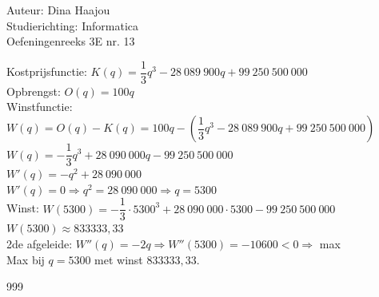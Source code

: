 \documentclass[a4paper]{article}
\begin{document}
\noindent \large Auteur: Dina Haajou \\
\noindent \large Studierichting: Informatica \\
\noindent \large Oefeningenreeks 3E nr. 13 \\

\normalsize

Kostprijsfunctie: $K(q) = \dfrac{1}{3}q^3 - 28\ 089\ 900q + 99\ 250\ 500\ 000$ \\

Opbrengst: $O(q) = 100q$ \\

Winstfunctie: $W(q) = O(q) - K(q) = 100q - \left(\dfrac{1}{3}q^3 - 28\ 089\ 900q + 99\ 250\ 500\ 000\right)$ \\

$W(q) = -\dfrac{1}{3}q^3 + 28\ 090\ 000q - 99\ 250\ 500\ 000$ \\

$W'(q) = -q^2 + 28\ 090\ 000$ \\

$W'(q) = 0 \Rightarrow q^2 = 28\ 090\ 000 \Rightarrow q = 5300$ \\

Winst: $W(5300) = -\dfrac{1}{3} \cdot 5300^3 + 28\ 090\ 000 \cdot 5300 - 99\ 250\ 500\ 000$ \\

$W(5300) \approx 833333{,}33$ \\

2de afgeleide: $W''(q) = -2q \Rightarrow W''(5300) = -10600 < 0 \Rightarrow$ max \\

Max bij $q = 5300$ met winst $833333{,}33$. \\

\begin{thebibliography}{999}
\end{thebibliography}
\end{document}
